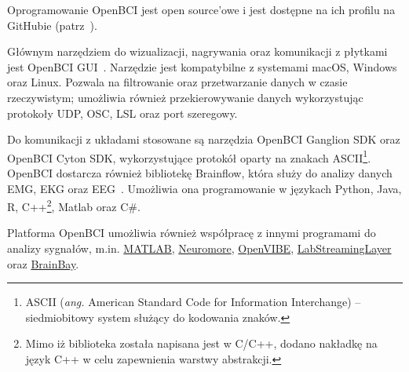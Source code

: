 \documentclass[skorowidz,skroty]{dyplomWEZUT}
\begin{document}
Oprogramowanie OpenBCI jest open source'owe i jest dostępne na ich profilu na GitHubie (patrz~\cite{openbci_github}).


Głównym narzędziem do wizualizacji, nagrywania oraz komunikacji z płytkami jest OpenBCI GUI~\cite{markiv_software_gui}. Narzędzie jest kompatybilne z systemami macOS, Windows oraz Linux. Pozwala na filtrowanie oraz przetwarzanie danych w czasie rzeczywistym; umożliwia również przekierowywanie danych wykorzystując protokoły UDP, OSC, LSL oraz port szeregowy.

Do komunikacji z układami stosowane są narzędzia OpenBCI Ganglion SDK oraz OpenBCI Cyton SDK, wykorzystujące protokół oparty na znakach ASCII\footnote{ASCII (\textit{ang.} American Standard Code for Information Interchange) -- siedmiobitowy system służący do kodowania znaków.}. OpenBCI dostarcza również bibliotekę Brainflow, która służy do analizy danych EMG, EKG oraz EEG~\cite{markiv_software_brainflow}. Umożliwia ona programowanie w językach Python, Java, R, C++\footnote{Mimo iż biblioteka została napisana jest w C/C++, dodano nakładkę na język C++ w celu zapewnienia warstwy abstrakcji.}, Matlab oraz C\#.

Platforma OpenBCI umożliwia również współpracę z innymi programami do analizy sygnałów, m.in. \href{https://www.mathworks.com/products/matlab.html}{MATLAB}, \href{https://www.neuromore.com/}{Neuromore}, \href{http://openvibe.inria.fr/}{OpenVIBE}, \href{https://github.com/sccn/labstreaminglayer}{LabStreamingLayer} oraz \href{http://www.shifz.org/brainbay/}{BrainBay}.
\end{document}

